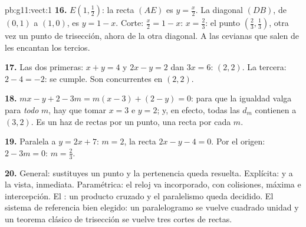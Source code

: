 \begin{solution}{pb:g11:vect:1}
\textbf{16.} $E\left(1, \frac12\right)$: la recta $(AE)$ es
$y = \frac x2$. La diagonal $(DB)$, de $(0,1)$ a $(1,0)$, es
$y = 1 - x$. Corte: $\frac x2 = 1 - x$: $x = \frac23$: el punto
$\left(\frac23, \frac13\right)$, otra vez un punto de trisección, ahora de
la otra diagonal. A las cevianas que salen de  les encantan
los tercios.

\textbf{17.} Las dos primeras: $x + y = 4$ y $2x - y = 2$ dan $3x = 6$:
$(2, 2)$. La tercera: $2 - 4 = -2$: se cumple. Son concurrentes en
$(2, 2)$.

\textbf{18.} $mx - y + 2 - 3m = m(x - 3) + (2 - y) = 0$: para que la
igualdad valga para \emph{todo} $m$, hay que tomar $x = 3$ e $y = 2$; y,
en efecto, todas las $d_m$ contienen a $(3, 2)$. Es un haz de rectas por
un punto, una recta por cada  $m$.

\textbf{19.} Paralela a $y = 2x + 7$:  $m = 2$, la recta
$2x - y - 4 = 0$. Por el origen: $2 - 3m = 0$: $m = \frac23$.

\textbf{20.} General: sustituyes un punto y la pertenencia queda
resuelta. Explícita:  y  a la vista, 
inmediata. Paramétrica: el reloj va incorporado, con colisiones, máxima
 e intercepción. El : un producto cruzado y el
paralelismo queda decidido. El sistema de referencia bien elegido: un
paralelogramo se vuelve cuadrado unidad y un teorema clásico de trisección
se vuelve tres cortes de rectas.
\end{solution}
